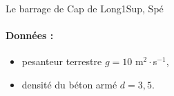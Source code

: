 \begin{exercise}{Le barrage de Cap de Long}{1}{Sup, Spé}
\paragraph{Données :}
\begin{itemize}
    \item pesanteur terrestre $g = 10$ m$^2\cdot$s$^{-1}$,
    \item densité du béton armé $d= 3,5$.
\end{itemize}
\end{exercise}